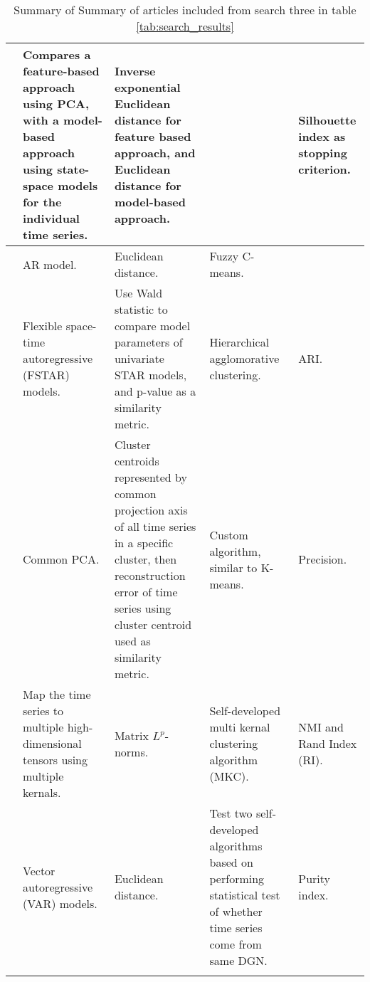 \begin{longtable}{p{}p{}p{}p{}p{}}
    \cite{load_tsc_state_space_model}       & Compares a feature-based approach using PCA, with a model-based approach using state-space models for the individual time series.& Inverse exponential Euclidean distance for feature based approach, and Euclidean distance for model-based approach.& & Silhouette index as stopping criterion.\\ \hline
    \cite{struct_damage_ar_fuzzy_c_means}   & AR model.& Euclidean distance.& Fuzzy C-means.& \\ \hline
    \cite{fstar_hac_tsc}                    & Flexible space-time autoregressive (FSTAR) models.& Use Wald statistic to compare model parameters of univariate STAR models, and p-value as a similarity metric.& Hierarchical agglomorative clustering.& ARI.\\ \hline
    \cite{multivariate_tsc_common_pca}      & Common PCA.& Cluster centroids represented by common projection axis of all time series in a specific cluster, then reconstruction error of time series using cluster centroid used as similarity metric.& Custom algorithm, similar to K-means.& Precision.\\ \hline
    \cite{tensor_multi_elastic_kernel_tsc}  & Map the time series to multiple high-dimensional tensors using multiple kernals.& Matrix $L^p$-norms.& Self-developed multi kernal clustering algorithm (MKC).& NMI and Rand Index (RI).\\ \hline
    \cite{var_multivar_tsc}                 & Vector autoregressive (VAR) models.& Euclidean distance.& Test two self-developed algorithms based on performing statistical test of whether time series come from same DGN. & Purity index.\\ \hline
    \hline
    \caption{Summary of Summary of articles included from search three in table \ref{tab:search_results}}
    \label{tab:tsc_summary}
\end{longtable}

